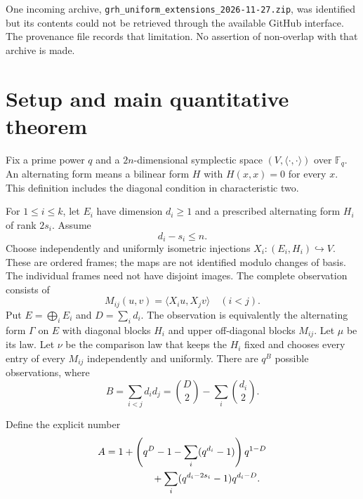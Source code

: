 \documentclass[11pt,letterpaper]{article}
\theoremstyle{definition}
\theoremstyle{remark}
\newcommand{\F}{\mathbb F}
\begin{document}
One incoming archive, \texttt{grh\_uniform\_extensions\_2026-11-27.zip}, was identified but its contents could not be retrieved through the available GitHub interface. The provenance file records that limitation. No assertion of non-overlap with that archive is made.

\section{Setup and main quantitative theorem}

Fix a prime power $q$ and a $2n$-dimensional symplectic space $(V,\langle\cdot,\cdot\rangle)$ over $\F_q$. An alternating form means a bilinear form $H$ with $H(x,x)=0$ for every $x$. This definition includes the diagonal condition in characteristic two.

For $1\le i\le k$, let $E_i$ have dimension $d_i\ge1$ and a prescribed alternating form $H_i$ of rank $2s_i$. Assume
\begin{equation}\label{eq:individual-feasibility}
 d_i-s_i\le n.
\end{equation}
Choose independently and uniformly isometric injections $X_i:(E_i,H_i)\hookrightarrow V$. These are ordered frames; the maps are not identified modulo changes of basis. The individual frames need not have disjoint images. The complete observation consists of
\[
 M_{ij}(u,v)=\langle X_i u,X_j v\rangle\quad(i<j).
\]
Put $E=\bigoplus_iE_i$ and $D=\sum_i d_i$. The observation is equivalently the alternating form $\Gamma$ on $E$ with diagonal blocks $H_i$ and upper off-diagonal blocks $M_{ij}$. Let $\mu$ be its law. Let $\nu$ be the comparison law that keeps the $H_i$ fixed and chooses every entry of every $M_{ij}$ independently and uniformly. There are $q^B$ possible observations, where
\begin{equation}\label{eq:B}
 B=\sum_{i<j}d_i d_j=\binom D2-\sum_i\binom{d_i}2.
\end{equation}

Define the explicit number
\begin{equation}\label{eq:A}
 \begin{split}
 A={}&1+\left(q^D-1-\sum_i(q^{d_i}-1)\right)q^{1-D}\\
 &\hspace{12mm}+\sum_i(q^{d_i-2s_i}-1)q^{d_i-D}.
 \end{split}
\end{equation}
\end{document}
